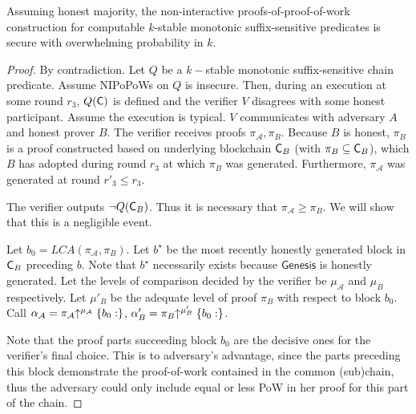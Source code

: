 \begin{thm}
	Assuming honest majority, the non-interactive
	proofs-of-proof-of-work construction for computable $k$-stable monotonic
	suffix-sensitive predicates is secure with overwhelming probability in $k$.
	\label{thm:suffix_security_soft_fork}
\end{thm}
\begin{proof}
	By contradiction. Let $Q$ be a $k-$stable monotonic
	suffix-sensitive chain predicate. Assume NIPoPoWs on $Q$ is insecure. Then,
	during an execution at some round  $r_3$, $Q(\mathsf{C})$ is defined and the verifier
	$V$ disagrees with some honest participant. Assume the execution is typical.
	$V$ communicates with adversary $A$ and honest prover $B$. The verifier receives
	proofs $\pi_\mathcal{A}, \pi_B$. Because $B$ is honest, $\pi_B$ is a proof constructed
	based on underlying blockchain $\mathsf{C}_B$ (with $\pi_B \subseteq \mathsf{C}_B$), which $B$
	has adopted during round $r_3$ at which $\pi_B$ was generated. Furthermore,
	$\pi_\mathcal{A}$ was generated at round $r'_3 \leq r_3$.

	The verifier outputs $\neg Q(\mathsf{C}_B)$. Thus it is necessary that $\pi_\mathcal{A} \geq 
	\pi_B$. We will show that this is a negligible event.

	Let $b_0 = LCA(\pi_\mathcal{A}, \pi_B)$. 
	Let $b^\star$ be the most recently honestly generated block in $\mathsf{C}_B$ preceding $b$. Note that $b^\star$ necessarily exists because $\mathsf{Genesis}$ is honestly generated. 
	Let the levels of comparison
	decided by the verifier be $\mu_\mathcal{A}$ and $\mu_B$ respectively. Let $\mu'_B$
	be the adequate level of proof $\pi_B$  with respect to block $b_0$. Call
	$\alpha_\mathcal{A} = \pi_\mathcal{A} \negthickspace\uparrow^{\mu_\mathcal{A}}\{b_0:\}$,
	$\alpha'_B = \pi_B \negthickspace\uparrow^{\mu'_B}\{b_0:\}$.

	Note that the  proof parts succeeding block $b_0$ are the decisive ones 
	for the verifier's final choice. This is to adversary's advantage, since the parts 
	preceding this block demonstrate the proof-of-work contained in the common 
	(sub)chain, thus the adversary could only include equal or less PoW
	in her proof for this part of the chain.



\end{proof}
